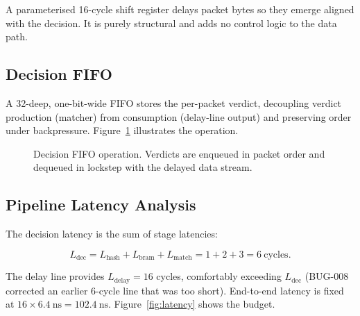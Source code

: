 \documentclass[12pt,twoside,openright]{book}
\begin{document}
A parameterised 16-cycle shift register delays packet bytes so they emerge aligned with the
decision. It is purely structural and adds no control logic to the data path.

\subsection{Decision FIFO}

A 32-deep, one-bit-wide FIFO stores the per-packet verdict, decoupling verdict production (matcher)
from consumption (delay-line output) and preserving order under backpressure. Figure~\ref{fig:decfifo}
illustrates the operation.

\begin{figure}[H]
\centering
\footnotesize
{}
\caption{Decision FIFO operation. Verdicts are enqueued in packet order and dequeued in lockstep
with the delayed data stream.}
\label{fig:decfifo}
\end{figure}

\subsection{Pipeline Latency Analysis}

The decision latency is the sum of stage latencies:

\begin{equation}
L_{\text{dec}} = L_{\text{hash}} + L_{\text{bram}} + L_{\text{match}} = 1 + 2 + 3 = 6\ \text{cycles}.
\label{eq:dec}
\end{equation}

\noindent The delay line provides $L_{\text{delay}} = 16$ cycles, comfortably exceeding
$L_{\text{dec}}$ (BUG-008 corrected an earlier 6-cycle line that was too short). End-to-end latency
is fixed at $16 \times 6.4\ \text{ns} = 102.4\ \text{ns}$. Figure~\ref{fig:latency} shows the budget.
\end{document}
